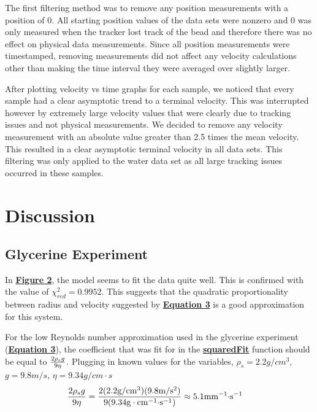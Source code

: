 \documentclass[
	letterpaper
	12pt
]{template}
\newcommand{\bref}[2]{\textbf{\hyperref[#1]{#2}}}
\begin{document}
The first filtering method was to remove any position measurements with a position of $0$. All starting position values of the data sets were nonzero and $0$ was only measured when the tracker lost track of the bead and therefore there was no effect on physical data measurements. Since all position measurements were timestamped, removing measurements did not affect any velocity calculations other than making the time interval they were averaged over slightly larger.\vspace{\baselineskip}

After plotting velocity vs time graphs for each sample, we noticed that every sample had a clear asymptotic trend to a terminal velocity. This was interrupted however by extremely large velocity values that were clearly due to tracking issues and not physical measurements. We decided to remove any velocity measurement with an absolute value greater than 2.5 times the mean velocity. This resulted in a clear asymptotic terminal velocity in all data sets. This filtering was only applied to the water data set as all large tracking issues occurred in these samples.
\section{Discussion}
\subsection{Glycerine Experiment}
In \bref{fig::terminalPlotG}{Figure 2}, the model seems to fit the data quite well. This is confirmed with the value of $\chi_{red}^2=0.9952$. This suggests that the quadratic proportionality between radius and velocity suggested by \bref{eqn::terminalVelocity}{Equation 3} is a good approximation for this system.\vspace{\baselineskip}

For the low Reynolds number approximation used in the glycerine experiment (\bref{fig::terminalPlotG}{Equation 3}), the coefficient that was fit for in the \bref{fnc::squaredFit}{squaredFit} function should be equal to $2\rho_s g \over 9\eta$. Plugging in known values for the variables, $\rho_s = 2.2\unit{g\per cm^3}$, $g = 9.8\unit{m\per s} $, $\eta = 9.34\unit{g \per{ cm \cdot s}}$ \cite{labManual}
\begin{align*}
	{2\rho_s g \over 9\eta} &= {2(2.2\unit{g \per cm^3})(9.8\unit{m\per s^2}) \over 9(9.34 \unit{g\cdot cm^{-1}\cdot  s^{-1} })} \approx 5.1\unit{mm^{-1}\cdot s^{-1}}
\end{align*}
\end{document}
